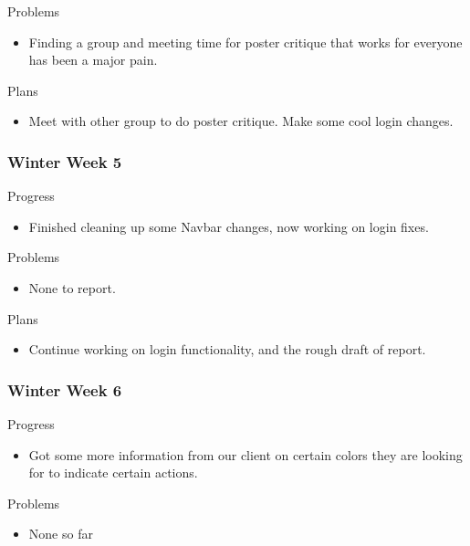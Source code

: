         \noindent
        Problems
        \begin{itemize}
            \item Finding a group and meeting time for poster critique that works for everyone has been a major pain.
        \end{itemize}
        
        \noindent
        Plans
        \begin{itemize}
            \item Meet with other group to do poster critique. Make some cool login changes.
        \end{itemize}
    \subsubsection{Winter Week 5}
        \noindent
        Progress
        \begin{itemize}
            \item Finished cleaning up some Navbar changes, now working on login fixes.
        \end{itemize}
        
        \noindent
        Problems
        \begin{itemize}
            \item None to report. 
        \end{itemize}
        
        \noindent
        Plans
        \begin{itemize}
            \item Continue working on login functionality, and the rough draft of report. 
        \end{itemize}
    \subsubsection{Winter Week 6}
        \noindent
        Progress
        \begin{itemize}
            \item Got some more information from our client on certain colors they are looking for to indicate certain actions.
        \end{itemize}
        
        \noindent
        Problems
        \begin{itemize}
            \item None so far
        \end{itemize}
        

